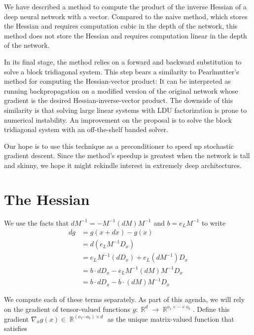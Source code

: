 \documentclass{article}
\newcommand{\R}{\mathop{\mathbb{R}}}
\begin{document}
We have described a method to compute the product of the inverse Hessian of a
deep neural network with a vector.  Compared to the naive method, which stores
the Hessian and requires computation cubic in the depth of the
network, this method does not store the Hessian and requires computation linear
in the depth of the network.

In its final stage, the method relies on a forward and backward substitution to
solve a block tridiagonal system.  This step bears a similarity to Pearlmutter's
method for computing the Hessian-vector product: It can be interpreted as
running backpropagation on a modified version of the original network whose
gradient is the desired Hessian-inverse-vector product.  The downside of this
similarity is that solving large linear systems with LDU factorization is prone
to numerical instability.  An improvement on the proposal is to solve the block
tridiagonal system with an off-the-shelf banded solver.

Our hope is to use this technique as a preconditioner to speed up stochastic
gradient descent.  Since the method's speedup is greatest when the network is
tall and skinny, we hope it might rekindle interest in extremely deep
architectures.




\appendix

\section{The Hessian}\label{sec:hessian}
We use the facts that
$dM^{-1} = -M^{-1} (dM) M^{-1}$ and $b=e_L M^{-1}$ to write
\begin{align}
  dg & = g(x+dx)- g(x)                                             \\
     & =d(e_L M^{-1} D_x) \nonumber                                \\
     & = e_L M^{-1} (dD_x)+ e_L \left(dM^{-1}\right) D_x \nonumber \\
     & = b \cdot dD_x  - e_L M^{-1} (dM) M^{-1} D_x \nonumber      \\
     & = b \cdot dD_x  - b \cdot (dM) M^{-1} D_x
\end{align}

We compute each of these terms separately. As part of this agenda, we will rely on the gradient of tensor-valued
functions $g:\R^d \to \R^{o_1 \times \cdots \times o_k}$. Define this gradient $\nabla_x g(x)\in \R^{(o_1 \cdots o_k)
    \times d}$ as the unique matrix-valued function that satisfies
\end{document}
